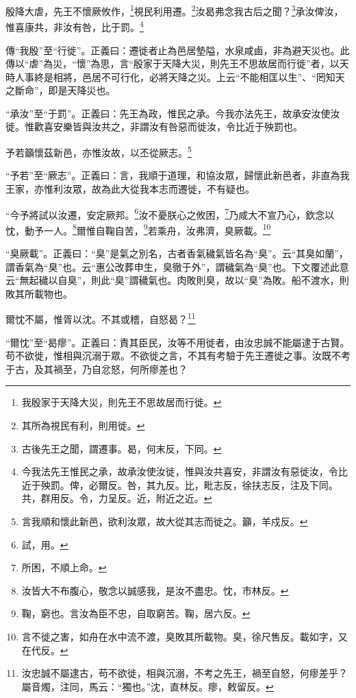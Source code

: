 殷降大虐，先王不懷厥攸作，\footnote{我殷家于天降大災，則先王不思故居而行徙。}視民利用遷。\footnote{其所為視民有利，則用徙。}汝曷弗念我古后之聞？\footnote{古後先王之聞，謂遷事。曷，何末反，下同。}承汝俾汝，惟喜康共，非汝有咎，比于罰。\footnote{今我法先王惟民之承，故承汝使汝徙，惟與汝共喜安，非謂汝有惡徙汝，令比近于殃罰。俾，必爾反。咎，其九反。比，毗志反，徐扶志反，注及下同。共，群用反。令，力呈反。近，附近之近。}

{\noindent\zhuan{}\fzbyks 傳“我殷”至“行徙”。正義曰：遷徙者止為邑居墊隘，水泉咸鹵，非為避天災也。此傳以“虐”為災，“懷”為思，言“殷家于天降大災，則先王不思故居而行徙”者，以天時人事終是相將，邑居不可行化，必將天降之災。上云“不能相匡以生”、“罔知天之斷命”，即是天降災也。 \par}

{\noindent\shu{}\fzkt “承汝”至“于罰”。正義曰：先王為政，惟民之承。今我亦法先王，故承安汝使汝徙。惟歡喜安樂皆與汝共之，非謂汝有咎惡而徙汝，令比近于殃罰也。 \par}

予若籲懷茲新邑，亦惟汝故，以丕從厥志。\footnote{言我順和懷此新邑，欲利汝眾，故大從其志而徙之。籲，羊戍反。}

{\noindent\shu{}\fzkt “予若”至“厥志”。正義曰：言，我順于道理，和協汝眾，歸懷此新邑者，非直為我王家，亦惟利汝眾，故為此大從我本志而遷徙，不有疑也。 \par}

“今予將試以汝遷，安定厥邦。\footnote{試，用。}汝不憂朕心之攸困，\footnote{所困，不順上命。}乃咸大不宣乃心，欽念以忱，動予一人。\footnote{汝皆大不布腹心，敬念以誠感我，是汝不盡忠。忱，市林反。}爾惟自鞠自苦，\footnote{鞠，窮也。言汝為臣不忠，自取窮苦。鞠，居六反。}若乘舟，汝弗濟，臭厥載。\footnote{言不徙之害，如舟在水中流不渡，臭敗其所載物。臭，徐尺售反。載如字，又在代反。}

{\noindent\shu{}\fzkt “臭厥載”。正義曰：“臭”是氣之別名，古者香氣穢氣皆名為“臭”。云“其臭如蘭”，謂香氣為“臭”也。云“惠公改葬申生，臭徹于外”，謂穢氣為“臭”也。下文覆述此意云“無起穢以自臭”，則此“臭”謂穢氣也。肉敗則臭，故以“臭”為敗。船不渡水，則敗其所載物也。 \par}

爾忱不屬，惟胥以沈。不其或稽，自怒曷？\footnote{汝忠誠不屬逮古，苟不欲徙，相與沉溺，不考之先王，禍至自怒，何瘳差乎？屬音燭，注同，馬云：“獨也。”沈，直林反。瘳，敕留反。}

{\noindent\shu{}\fzkt “爾忱”至“曷瘳”。正義曰：責其臣民，汝等不用徙者，由汝忠誠不能屬逮于古賢。苟不欲徙，惟相與沉溺于眾。不欲徙之言，不其有考驗于先王遷徙之事。汝既不考于古，及其禍至，乃自忿怒，何所瘳差也？ \par}

